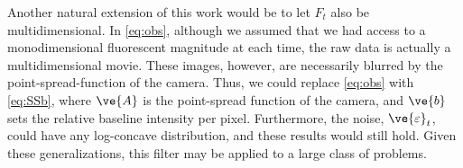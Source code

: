 Another natural extension of this work would be to let $F_t$ also be multidimensional.  In \eqref{eq:obs}, although we assumed that we had access to a monodimensional fluorescent magnitude at each time, the raw data is actually a multidimensional movie. These images, however, are necessarily blurred by the point-spread-function of the camera.  Thus, we could replace \eqref{eq:obs} with \eqref{eq:SSb}, where $\ve{A}$ is the point-spread function of the camera, and $\ve{b}$ sets the relative baseline intensity per pixel. %
Furthermore, the noise, $\ve{\varepsilon}_t$, could have any log-concave distribution, and these results would still hold. Given these generalizations, this filter may be applied to a large class of problems.

